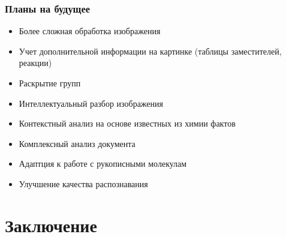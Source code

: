 \begin{frame}
  \frametitle{Планы на будущее}
  \begin{itemize}
    \item Более сложная обработка изображения
    \item Учет дополнительной информации на картинке (таблицы заместителей, реакции)
    \item Раскрытие групп
    \item Интеллектуальный разбор изображения
    \item Контекстный анализ на основе известных из химии фактов
    \item Комплексный анализ документа
    \item Адаптция к работе с рукописными молекулам
    \item Улучшение качества распознавания
  \end{itemize}
\end{frame}

\section{Заключение}

